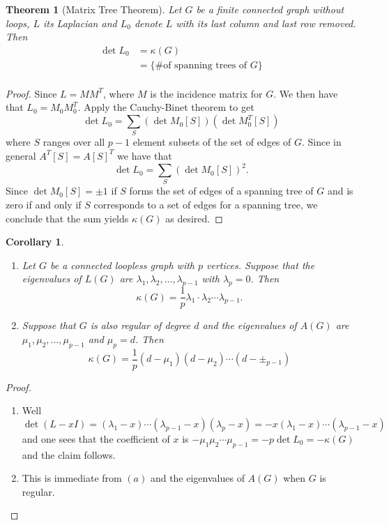 \documentclass[10pt, letterpaper]{article}
\newtheorem{thm}{Theorem}
\newtheorem{cor}{Corollary}
\theoremstyle{remark}
\theoremstyle{definition}
\begin{document}
    \begin{thm}[Matrix Tree Theorem]
        Let $G$ be a finite connected graph without loops, $L$ its Laplacian and $L_0$ denote $L$ with its last column
        and last row removed. Then
        \begin{align*}
            \det L_0 &= \kappa (G) \\
                     &= \{\text{\# of spanning trees of } G\} \\
        \end{align*}
    \end{thm}

    \begin{proof}
        Since $L=MM^T$, where $M$ is the incidence matrix for $G$. We then have that $L_0 = M_0 M_0^T$. Apply the
        Cauchy-Binet theorem to get
        \[
            \det L_0 = \sum_{S} \left( \det M_0[S]\right) \left( \det M_0^T[S]\right)
        \]
        where $S$ ranges over all $p-1$ element subsets of the set of edges of $G$. Since in general $A^T[S]=A[S]^T$ we
        have that
        \[
            \det L_0 = \sum_S \left( \det M_0[S] \right)^2.
        \]
        Since $\det M_0[S] = \pm 1$ if $S$ forms the set of edges of a spanning tree of $G$ and is zero if and only if $S$
        corresponds to a set of edges for a spanning tree, we conclude that the sum yields $\kappa(G)$ as desired.
    \end{proof}

    \begin{cor} \leavevmode
        \begin{enumerate}
            \item [(a)] Let $G$ be a connected loopless graph with $p$ vertices. Suppose that the eigenvalues of $L(G)$
            are $\lambda_1, \lambda_2, \ldots, \lambda_{p-1}$ with $\lambda_p = 0$. Then
            \[
                \kappa(G) = \frac{1}{p} \lambda_1 \cdot \lambda_2 \cdots \lambda_{p-1}.
            \]
            \item [(b)] Suppose that $G$ is also regular of degree $d$ and the eigenvalues of $A(G)$ are $\mu_1, \mu_2, \ldots, \mu_{p-1}$
            and $\mu_p = d$. Then
            \[
                \kappa(G) = \frac{1}{p} (d-\mu_1)(d-\mu_2) \cdots (d-\pm_{p-1})
            \]
        \end{enumerate}
    \end{cor}

    \begin{proof}
        \begin{enumerate}
            \item [(a)] Well
            \[
                \det(L-xI) = (\lambda_1 - x) \cdots (\lambda_{p-1} - x)(\lambda_p - x) = - x (\lambda_1 -x ) \cdots (\lambda_{p-1} - x)
            \]
            and one sees that the coefficient of $x$ is $-\mu_1 \mu_2 \cdots \mu_{p-1} = - p \det L_0 = - \kappa(G)$ and the claim follows.
            \item [(b)] This is immediate from $(a)$ and the eigenvalues of $A(G)$ when $G$ is regular.
        \end{enumerate}
    \end{proof}
\end{document}
